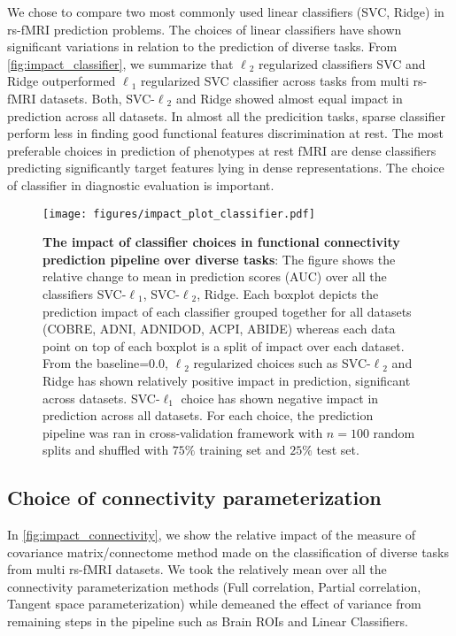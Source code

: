 \documentclass[5p]{elsarticle}
\begin{document}
     We chose to compare two most commonly used linear classifiers
     (SVC, Ridge) in rs-fMRI prediction problems.
     The choices of linear classifiers have shown significant variations in
     relation to the prediction of diverse tasks.
     From \autoref{fig:impact_classifier}, we summarize that $\ell{_2}$
     regularized classifiers SVC and Ridge outperformed $\ell{_1}$ regularized
     SVC classifier across tasks from multi rs-fMRI datasets. Both,
     SVC-$\ell{_2}$ and Ridge showed almost equal impact in prediction across all
     datasets. In almost all the predicition tasks, sparse classifier perform
     less in finding good functional features discrimination at rest.
     The most preferable choices in prediction of phenotypes at rest fMRI are
     dense classifiers predicting significantly target features lying in dense
     representations. The choice of classifier in diagnostic evaluation is
     important.

\begin{figure}
    \centerline{%
    \texttt{[image: figures/impact\_plot\_classifier.pdf]}%
    }%
    \caption[choice of classifier]{\textbf{The impact of classifier
            choices in functional connectivity prediction pipeline over
            diverse tasks}:
            The figure shows the relative change to mean in prediction scores
            (AUC) over all the classifiers SVC-$\ell{_1}$, SVC-$\ell{_2}$,
            Ridge. Each boxplot depicts the prediction
            impact of each classifier grouped together for all datasets
            (COBRE, ADNI, ADNIDOD, ACPI, ABIDE) whereas each data point on top
            of each boxplot is a split of impact over each dataset.
            From the baseline=$0.0$, $\ell{_2}$ regularized choices such as
            SVC-$\ell{_2}$ and Ridge has
            shown relatively positive impact in prediction, significant
            across datasets. SVC-$\ell_{1}$ choice has shown negative impact in
            prediction across all datasets. For each choice, the prediction pipeline
            was ran in cross-validation framework with $n=100$ random splits
            and shuffled with $75\%$ training set and $25\%$ test set.
            } 
\label{fig:impact_classifier}
\end{figure}

\subsection{Choice of connectivity parameterization}
In \autoref{fig:impact_connectivity}, we show the relative impact of
the measure of covariance matrix/connectome method made on the classification
of diverse tasks from multi rs-fMRI datasets. We took the relatively mean over
all the connectivity parameterization methods (Full correlation, Partial
correlation, Tangent space parameterization) while demeaned the effect of
variance from remaining steps in the pipeline such as Brain ROIs and Linear
Classifiers.
\end{document}
